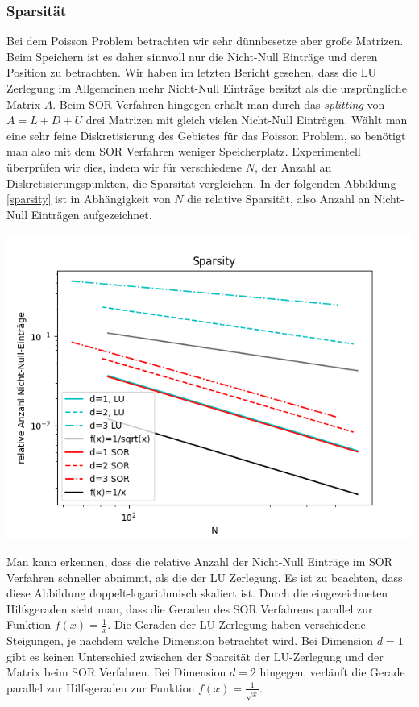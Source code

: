 \documentclass[smallheadings]{scrartcl}
\theoremstyle{definition}
\begin{document}
 

\subsubsection{Sparsität}
Bei dem Poisson Problem betrachten wir sehr dünnbesetze aber große Matrizen.  Beim Speichern ist es daher sinnvoll nur die Nicht-Null Einträge und deren Position zu betrachten.  Wir haben im letzten Bericht gesehen,  dass die LU Zerlegung im Allgemeinen mehr Nicht-Null Einträge besitzt als die ursprüngliche Matrix $A$.  Beim SOR Verfahren hingegen erhält man durch das \textit{splitting} von $A=L+D+U$ drei Matrizen mit gleich vielen Nicht-Null Einträgen.  Wählt man eine sehr feine Diskretisierung des Gebietes für das Poisson Problem,  so benötigt man also mit dem SOR Verfahren weniger Speicherplatz.   Experimentell überprüfen wir dies, indem wir für verschiedene $N$, der Anzahl an Diskretisierungspunkten, die Sparsität vergleichen. 
In der folgenden Abbildung \ref{sparsity} ist in Abhängigkeit von $N$ die relative Sparsität, also Anzahl an Nicht-Null Einträgen aufgezeichnet. 

\begin{minipage}{\textwidth}

 \centering
 \includegraphics[scale = 0.9]{Sparsity1}
 	\label{sparsity}

 \end{minipage}

Man kann erkennen, dass die relative Anzahl der Nicht-Null Einträge im SOR Verfahren schneller abnimmt, als die der LU Zerlegung.  Es ist zu beachten, dass diese Abbildung doppelt-logarithmisch  skaliert ist.  Durch die eingezeichneten Hilfsgeraden sieht man, dass die Geraden des SOR Verfahrens parallel zur Funktion $f(x)=\frac{1}{x}$. Die Geraden der LU Zerlegung haben verschiedene Steigungen,  je nachdem welche Dimension betrachtet wird. Bei Dimension $d=1$ gibt es keinen Unterschied zwischen der Sparsität der LU-Zerlegung und der Matrix beim SOR Verfahren.  Bei Dimension $d=2$ hingegen, verläuft die Gerade parallel zur Hilfsgeraden zur Funktion $f(x)=\frac{1}{\sqrt{x}}$. 
\end{document}
